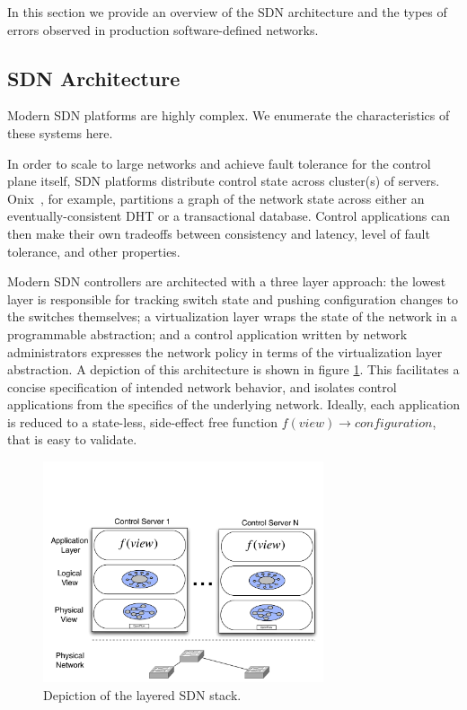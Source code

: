 In this section we provide an overview of the SDN architecture and the types
of errors observed in production software-defined networks.

\subsection{SDN Architecture}

Modern SDN platforms are highly complex. We enumerate the characteristics of
these systems here.

In order to scale to large networks and achieve fault tolerance for the control
plane itself, SDN platforms distribute control state across cluster(s) of servers.
Onix~\cite{onix}, for example,
partitions a graph of the network state across either an eventually-consistent
DHT or a transactional database. Control applications can then make their own
tradeoffs between consistency and latency, level of fault tolerance, and other
properties.

Modern SDN controllers are architected with a three layer approach: the lowest
layer is responsible for tracking switch state and pushing configuration
changes to the switches themselves; a virtualization layer
wraps the state of the network in a programmable abstraction; and a control
application written by network administrators 
expresses the network policy in terms of the virtualization layer abstraction.
A depiction of this architecture is shown in figure \ref{fig:basicarch}.
This facilitates a concise specification of
intended network behavior, and isolates control applications from the specifics
of the underlying network. Ideally, each application is reduced to a
state-less, side-effect free function $f(view) \rightarrow configuration$, that is
easy to validate. 

\begin{figure}[t]
    \hspace{-10pt}
    \includegraphics[width=3.25in]{../diagrams/architecture/SDN_stack.pdf}
    \caption[]{\label{fig:basicarch} Depiction of the layered SDN stack.} 
\end{figure}

